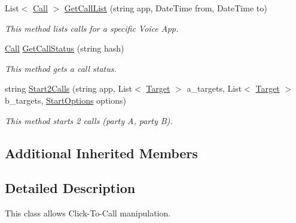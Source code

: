 \begin{DoxyCompactItemize}
List$<$ \hyperlink{class_thecallr_api_1_1_objects_1_1_click_to_call_1_1_call}{Call} $>$ \hyperlink{class_thecallr_api_1_1_services_1_1_client_1_1_click_to_call_service_a7771eb29926fc182005351d22a2fa233}{Get\+Call\+List} (string app, Date\+Time from, Date\+Time to)
\begin{DoxyCompactList}\small\item\em This method lists calls for a specific Voice App. \end{DoxyCompactList}\item 
\hyperlink{class_thecallr_api_1_1_objects_1_1_click_to_call_1_1_call}{Call} \hyperlink{class_thecallr_api_1_1_services_1_1_client_1_1_click_to_call_service_ae24fd30da5c02c1f9d9c3eb4d0cf9ba9}{Get\+Call\+Status} (string hash)
\begin{DoxyCompactList}\small\item\em This method gets a call status. \end{DoxyCompactList}\item 
string \hyperlink{class_thecallr_api_1_1_services_1_1_client_1_1_click_to_call_service_a4122c61ebaf50e0d62047c89201c5e51}{Start2\+Calls} (string app, List$<$ \hyperlink{class_thecallr_api_1_1_objects_1_1_misc_1_1_target}{Target} $>$ a\+\_\+targets, List$<$ \hyperlink{class_thecallr_api_1_1_objects_1_1_misc_1_1_target}{Target} $>$ b\+\_\+targets, \hyperlink{class_thecallr_api_1_1_objects_1_1_click_to_call_1_1_start_options}{Start\+Options} options)
\begin{DoxyCompactList}\small\item\em This method starts 2 calls (party A, party B). \end{DoxyCompactList}\end{DoxyCompactItemize}
\subsection*{Additional Inherited Members}


\subsection{Detailed Description}
This class allows Click-\/\+To-\/\+Call manipulation. 



